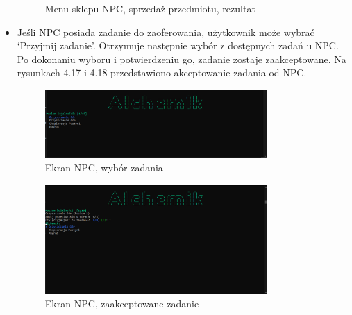 \begin{itemize}
\begin{figure}[H]
            \caption{Menu sklepu NPC, sprzedaż przedmiotu, rezultat}
            \label{fig:npc_9}
        \end{figure}
    \item Jeśli NPC posiada zadanie do zaoferowania, użytkownik może wybrać `Przyjmij zadanie'. Otrzymuje następnie wybór z dostępnych zadań u NPC.
    Po dokonaniu wyboru i potwierdzeniu go, zadanie zostaje zaakceptowane. Na rysunkach 4.17 i 4.18 przedstawiono akceptowanie zadania od NPC.
        \begin{figure}[H]
            \centering
            \includegraphics[width=0.8\textwidth]{figures/warstwa_uzytkowa/npc_10.png}
            \caption{Ekran NPC, wybór zadania}
            \label{fig:npc_10}
        \end{figure}
        \begin{figure}[H]
            \centering
            \includegraphics[width=0.8\textwidth]{figures/warstwa_uzytkowa/npc_11.png}
            \caption{Ekran NPC, zaakceptowane zadanie}
            \label{fig:npc_11}
        \end{figure}
\end{itemize}
